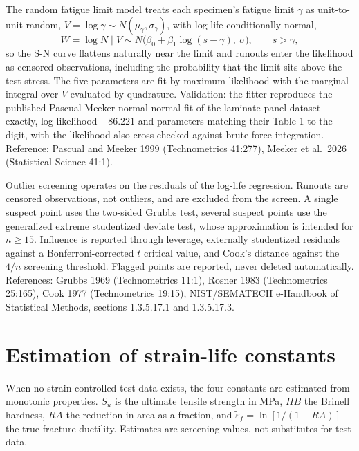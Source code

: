 \documentclass[11pt]{article}
\begin{document}
The random fatigue limit model treats each specimen's fatigue limit
\(\gamma\) as unit-to-unit random, \(V = \log\gamma \sim
N(\mu_\gamma,\sigma_\gamma)\), with log life conditionally normal,
\begin{equation}
W = \log N \mid V \sim N\big(\beta_0 + \beta_1 \log(s-\gamma),\ \sigma\big),
\qquad s > \gamma,
\end{equation}
so the S-N curve flattens naturally near the limit and runouts enter the
likelihood as censored observations, including the probability that the
limit sits above the test stress. The five parameters are fit by maximum
likelihood with the marginal integral over \(V\) evaluated by quadrature.
Validation: the fitter reproduces the published Pascual-Meeker
normal-normal fit of the laminate-panel dataset exactly, log-likelihood
\(-86.221\) and parameters matching their Table 1 to the digit, with the
likelihood also cross-checked against brute-force integration. Reference:
Pascual and Meeker 1999 (Technometrics 41:277), Meeker et al.\ 2026
(Statistical Science 41:1).

Outlier screening operates on the residuals of the log-life regression.
Runouts are censored observations, not outliers, and are excluded from the
screen. A single suspect point uses the two-sided Grubbs test, several suspect
points use the generalized extreme studentized deviate test, whose
approximation is intended for \(n \ge 15\). Influence is reported through
leverage, externally studentized residuals against a Bonferroni-corrected
\(t\) critical value, and Cook's distance against the \(4/n\) screening
threshold. Flagged points are reported, never deleted automatically.
References: Grubbs 1969 (Technometrics 11:1), Rosner 1983 (Technometrics
25:165), Cook 1977 (Technometrics 19:15), NIST/SEMATECH e-Handbook of
Statistical Methods, sections 1.3.5.17.1 and 1.3.5.17.3.

\section{Estimation of strain-life constants}
When no strain-controlled test data exists, the four constants are estimated
from monotonic properties. \(S_u\) is the ultimate tensile strength in
\si{\mega\pascal}, \(HB\) the Brinell hardness, \(RA\) the reduction in area
as a fraction, and \(\tilde\varepsilon_f = \ln[1/(1-RA)]\) the true fracture
ductility. Estimates are screening values, not substitutes for test data.
\end{document}
